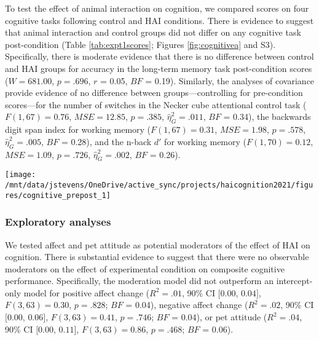 \documentclass[
  english,
  pub,floatsintext]{apa6}
\begin{document}
To test the effect of animal interaction on cognition, we compared scores on four cognitive tasks following control and HAI conditions. There is evidence to suggest that animal interaction and control groups did not differ on any cognitive task post-condition (Table \ref{tab:expt1scores}; Figures \ref{fig:cognitivea} and S3). Specifically, there is moderate evidence that there is no difference between control and HAI groups for accuracy in the long-term memory task post-condition scores (\(W = 681.00\), \(p = .696\), \(r\) = 0.05, \(BF\) = 0.19). Similarly, the analyses of covariance provide evidence of no difference between groups---controlling for pre-condition scores---for the number of switches in the Necker cube attentional control task (\(F(1, 67) = 0.76\), \(\mathit{MSE} = 12.85\), \(p = .385\), \(\hat{\eta}^2_G = .011\), \(BF\) = 0.34), the backwards digit span index for working memory (\(F(1, 67) = 0.31\), \(\mathit{MSE} = 1.98\), \(p = .578\), \(\hat{\eta}^2_G = .005\), \(BF\) = 0.28), and the n-back \(d'\) for working memory (\(F(1, 70) = 0.12\), \(\mathit{MSE} = 1.09\), \(p = .726\), \(\hat{\eta}^2_G = .002\), \(BF\) = 0.26).



\begin{figure*}
\texttt{[image: /mnt/data/jstevens/OneDrive/active\_sync/projects/haicognition2021/figures/cognitive\_prepost\_1]} \caption{Cognitive performance for control and HAI (human-animal interaction) groups in Experiment 1. (a) Long-term memory accuracy from the Deese-Roedinger-McDermott task was calculated only post-condition. Pre- (Pre) and post-condition (Post) performance was calculated for (b) the difference in number of attentional shifts between the two Necker cube trials, (c) the index for the backwards digit span task, and (d) \(d'\) for the n-back task. Open triangles (blue) represent individual control participant scores, open circles (orange) represent individual HAI participant scores, closed triangles and circles represent condition group means (with lines connecting condition means), error bars represent 95\% confidence intervals.}\label{fig:cognitivea}
\end{figure*}

\hypertarget{exploratory-analyses}{%
\subsubsection{Exploratory analyses}\label{exploratory-analyses}}

We tested affect and pet attitude as potential moderators of the effect of HAI on cognition. There is substantial evidence to suggest that there were no observable moderators on the effect of experimental condition on composite cognitive performance. Specifically, the moderation model did not outperform an intercept-only model for positive affect change (\(R^2 = .01\), 90\% CI \([0.00\), \(0.04]\), \(F(3, 63) = 0.30\), \(p = .828\); \(BF\) = 0.04), negative affect change (\(R^2 = .02\), 90\% CI \([0.00\), \(0.06]\), \(F(3, 63) = 0.41\), \(p = .746\); \(BF\) = 0.04), or pet attitude (\(R^2 = .04\), 90\% CI \([0.00\), \(0.11]\), \(F(3, 63) = 0.86\), \(p = .468\); \(BF\) = 0.06).
\end{document}
